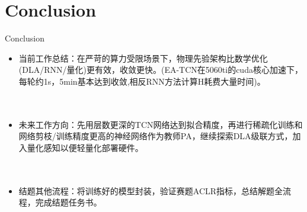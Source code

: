 \documentclass[20pt, cjk, slidetop, table]{beamer}
\begin{document}
\section{Conclusion}
\begin{frame}{Conclusion}
\begin{itemize}
    \item 当前工作总结：在严苛的算力受限场景下，物理先验架构比数学优化(DLA/RNN/量化)更有效，收敛更快。(EA-TCN在5060ti的cuda核心加速下，每轮约1s，5min基本达到收敛,相反RNN方法计算H耗费大量时间)。\\
    ~\\
     ~\\
    \item 未来工作方向：先用层数更深的TCN网络达到拟合精度，再进行稀疏化训练和网络剪枝/训练精度更高的神经网络作为教师PA，继续探索DLA级联方式，加入量化感知以便轻量化部署硬件。\\
    ~\\
     ~\\
    \item 结题其他流程：将训练好的模型封装，验证赛题ACLR指标，总结解题全流程，完成结题任务书。\\
    ~\\
\end{itemize}
\end{frame}
\end{document}
